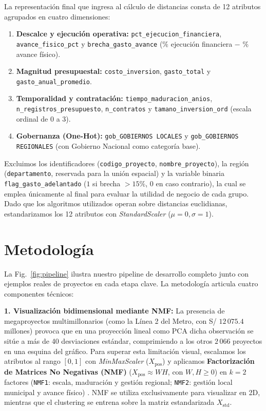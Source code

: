 \documentclass[conference]{IEEEtran}
\begin{document}
La representaci\'on final que ingresa al c\'alculo de distancias consta de 12 atributos agrupados en cuatro dimensiones:
\begin{enumerate}
    \item \textbf{Descalce y ejecuci\'on operativa:} \texttt{pct\_ejecucion\_financiera}, \texttt{avance\_fisico\_pct} y \texttt{brecha\_gasto\_avance} ($\%$ ejecuci\'on financiera $-$ $\%$ avance f\'isico).
    \item \textbf{Magnitud presupuestal:} \texttt{costo\_inversion}, \texttt{gasto\_total} y \texttt{gasto\_anual\_promedio}.
    \item \textbf{Temporalidad y contrataci\'on:} \texttt{tiempo\_maduracion\_anios}, \texttt{n\_registros\_presupuesto}, \texttt{n\_contratos} y \texttt{tamano\_inversion\_ord} (escala ordinal de $0$ a $3$).
    \item \textbf{Gobernanza (One-Hot):} \texttt{gob\_GOBIERNOS LOCALES} y \texttt{gob\_GOBIERNOS REGIONALES} (con Gobierno Nacional como categor\'ia base).
\end{enumerate}

Excluimos los identificadores (\texttt{codigo\_proyecto}, \texttt{nombre\_proyecto}), la regi\'on (\texttt{departamento}, reservada para la uni\'on espacial) y la variable binaria \texttt{flag\_gasto\_adelantado} ($1$ si brecha $> 15\%$, $0$ en caso contrario), la cual se emplea \'unicamente al final para evaluar la utilidad de negocio de cada grupo. Dado que los algoritmos utilizados operan sobre distancias euclidianas, estandarizamos los 12 atributos con \textit{StandardScaler} ($\mu = 0, \sigma = 1$).

\section{Metodolog\'ia}

La Fig.~\ref{fig:pipeline} ilustra nuestro pipeline de desarrollo completo junto con ejemplos reales de proyectos en cada etapa clave. La metodolog\'ia articula cuatro componentes t\'ecnicos:

\textbf{1. Visualizaci\'on bidimensional mediante NMF:} La presencia de megaproyectos multimillonarios (como la L\'inea 2 del Metro, con S/ $12\,075.4$ millones) provoca que en una proyecci\'on lineal como PCA dicha observaci\'on se sit\'ue a m\'as de 40 desviaciones est\'andar, comprimiendo a los otros $2\,066$ proyectos en una esquina del gr\'afico. Para superar esta limitaci\'on visual, escalamos los atributos al rango $[0, 1]$ con \textit{MinMaxScaler} ($X_{\text{pos}}$) y aplicamos \textbf{Factorizaci\'on de Matrices No Negativas (NMF)} ($X_{\text{pos}} \approx WH$, con $W, H \ge 0$) en $k = 2$ factores (\texttt{NMF1}: escala, maduraci\'on y gesti\'on regional; \texttt{NMF2}: gesti\'on local municipal y avance f\'isico) \cite{pedregosa2011}. NMF se utiliza exclusivamente para visualizar en 2D, mientras que el clustering se entrena sobre la matriz estandarizada $X_{\text{std}}$.
\end{document}
